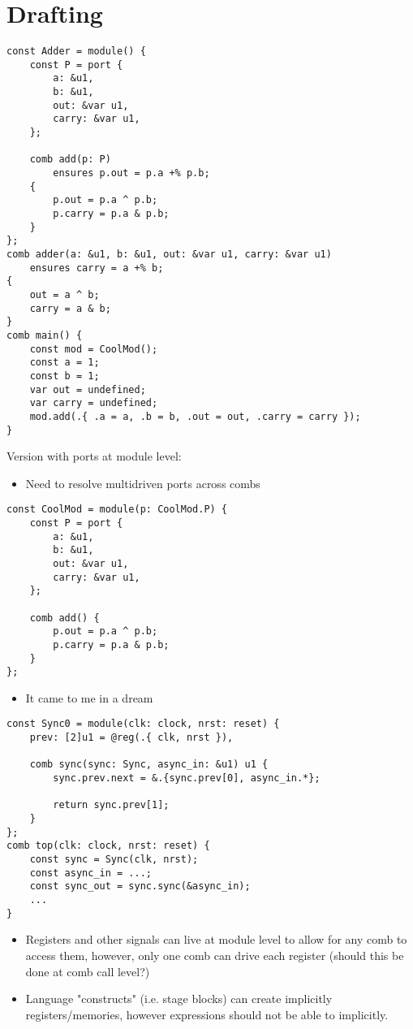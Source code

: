 \documentclass[10pt]{article}
\begin{document}
\section{Drafting}

\begin{verbatim}
const Adder = module() {
    const P = port {
        a: &u1,
        b: &u1,
        out: &var u1,
        carry: &var u1,
    };

    comb add(p: P) 
        ensures p.out = p.a +% p.b;
    {
        p.out = p.a ^ p.b; 
        p.carry = p.a & p.b;
    }
};
comb adder(a: &u1, b: &u1, out: &var u1, carry: &var u1)
    ensures carry = a +% b;
{
    out = a ^ b;
    carry = a & b;
}
comb main() {
    const mod = CoolMod();
    const a = 1;
    const b = 1;
    var out = undefined;
    var carry = undefined;
    mod.add(.{ .a = a, .b = b, .out = out, .carry = carry });
}
\end{verbatim}

Version with ports at module level:
\begin{itemize}
	\item Need to resolve multidriven ports across combs
\end{itemize}

\begin{verbatim}
const CoolMod = module(p: CoolMod.P) {
    const P = port {
        a: &u1,
        b: &u1,
        out: &var u1,
        carry: &var u1,
    };

    comb add() {
        p.out = p.a ^ p.b; 
        p.carry = p.a & p.b;
    }
};
\end{verbatim}

\begin{itemize}
	\item It came to me in a dream
\end{itemize}

\begin{verbatim}
const Sync0 = module(clk: clock, nrst: reset) {
    prev: [2]u1 = @reg(.{ clk, nrst }),

    comb sync(sync: Sync, async_in: &u1) u1 {
        sync.prev.next = &.{sync.prev[0], async_in.*};

        return sync.prev[1];
    }
};
comb top(clk: clock, nrst: reset) {
    const sync = Sync(clk, nrst);
    const async_in = ...;
    const sync_out = sync.sync(&async_in);
    ...
}
\end{verbatim}

\begin{itemize}
	\item Registers and other signals can live at module level to allow for any comb to access them,
	      however, only one comb can drive each register (should this be done at comb call level?)
	\item Language "constructs" (i.e. stage blocks) can create implicitly registers/memories,
	      however expressions should not be able to implicitly.
\end{itemize}
\end{document}
